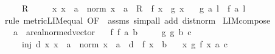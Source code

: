 \begin{isabellebody}
\ \ \ {\isachardoublequoteopen}{}\ {\isacharless}{\kern0pt}\ R{\isachardoublequoteclose}\isanewline
\ \ \ \ \ {\isachardoublequoteopen}{\isasymAnd}x{\isachardot}{\kern0pt}\ x\ {\isasymnoteq}\ a\ {\isasymLongrightarrow}\ norm\ {\isacharparenleft}{\kern0pt}x\ {\isacharminus}{\kern0pt}\ a{\isacharparenright}{\kern0pt}\ {\isacharless}{\kern0pt}\ R\ {\isasymLongrightarrow}\ f\ x\ {\isacharequal}{\kern0pt}\ g\ x{\isachardoublequoteclose}\isanewline
\ \ \ {\isachardoublequoteopen}g\ {\isasymmidarrow}a{\isasymrightarrow}\ l\ {\isasymLongrightarrow}\ f\ {\isasymmidarrow}a{\isasymrightarrow}\ l{\isachardoublequoteclose}\isanewline
%
\isadelimproof
\ \ %
\endisadelimproof
%
\isatagproof
{}\isamarkupfalse%
\ {\isacharparenleft}{\kern0pt}rule\ metric{\isacharunderscore}{\kern0pt}LIM{\isacharunderscore}{\kern0pt}equal{}\ {\isacharbrackleft}{\kern0pt}OF\ {\isacharunderscore}{\kern0pt}\ assms{\isacharbrackright}{\kern0pt}{\isacharparenright}{\kern0pt}\ {\isacharparenleft}{\kern0pt}simp{\isacharunderscore}{\kern0pt}all\ add{\isacharcolon}{\kern0pt}\ dist{\isacharunderscore}{\kern0pt}norm{\isacharparenright}{\kern0pt}%
\endisatagproof
{\isafoldproof}%
%
\isadelimproof
\isanewline
%
\endisadelimproof
\isanewline
{}\isamarkupfalse%
\ LIM{\isacharunderscore}{\kern0pt}compose{}{\isacharcolon}{\kern0pt}\isanewline
\ \ \ a\ {\isacharcolon}{\kern0pt}{\isacharcolon}{\kern0pt}\ {\isachardoublequoteopen}{\isacharprime}{\kern0pt}a{\isacharcolon}{\kern0pt}{\isacharcolon}{\kern0pt}real{\isacharunderscore}{\kern0pt}normed{\isacharunderscore}{\kern0pt}vector{\isachardoublequoteclose}\isanewline
\ \ \ f{\isacharcolon}{\kern0pt}\ {\isachardoublequoteopen}f\ {\isasymmidarrow}a{\isasymrightarrow}\ b{\isachardoublequoteclose}\isanewline
\ \ \ \ \ g{\isacharcolon}{\kern0pt}\ {\isachardoublequoteopen}g\ {\isasymmidarrow}b{\isasymrightarrow}\ c{\isachardoublequoteclose}\isanewline
\ \ \ \ \ inj{\isacharcolon}{\kern0pt}\ {\isachardoublequoteopen}{\isasymexists}d{\isachargreater}{\kern0pt}{}{\isachardot}{\kern0pt}\ {\isasymforall}x{\isachardot}{\kern0pt}\ x\ {\isasymnoteq}\ a\ {\isasymand}\ norm\ {\isacharparenleft}{\kern0pt}x\ {\isacharminus}{\kern0pt}\ a{\isacharparenright}{\kern0pt}\ {\isacharless}{\kern0pt}\ d\ {\isasymlongrightarrow}\ f\ x\ {\isasymnoteq}\ b{\isachardoublequoteclose}\isanewline
\ \ \ {\isachardoublequoteopen}{\isacharparenleft}{\kern0pt}{\isasymlambda}x{\isachardot}{\kern0pt}\ g\ {\isacharparenleft}{\kern0pt}f\ x{\isacharparenright}{\kern0pt}{\isacharparenright}{\kern0pt}\ {\isasymmidarrow}a{\isasymrightarrow}\ c{\isachardoublequoteclose}\isanewline

\end{isabellebody}
